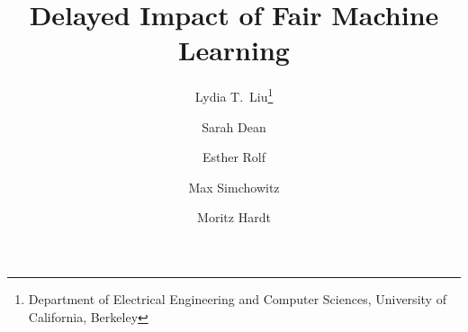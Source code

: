 \documentclass[11pt,letter]{article}
\title{\textbf{Delayed Impact of Fair Machine Learning}}
\author{
\and Lydia T.~Liu\thanks{Department of Electrical Engineering and Computer Sciences, University of California, Berkeley}
\and Sarah Dean\footnotemark[1]
\and Esther Rolf\footnotemark[1]
\and Max Simchowitz\footnotemark[1]
\and Moritz Hardt\footnotemark[1]}
\theoremstyle{definition}
\theoremstyle{plain}
\theoremstyle{definition}
\theoremstyle{remark}
\begin{document}
\maketitle

\begin{abstract}

\end{abstract}












\pagebreak



\begin{appendix}




\end{appendix}
\end{document}
